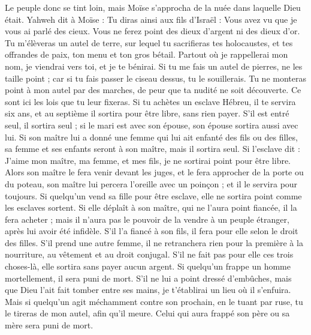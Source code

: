 \begin{multicols}{2}
Le peuple donc se tint loin, mais Moïse s'approcha de la nuée dans laquelle Dieu était.
Yahweh dit à Moïse : Tu diras ainsi aux fils d'Israël : Vous avez vu que je vous ai parlé des cieux.
Vous ne ferez point des dieux d'argent ni des dieux d'or.
Tu m’élèveras un autel de terre, sur lequel tu sacrifieras tes holocaustes, et tes offrandes de paix, ton menu et ton gros bétail. Partout où je rappellerai mon nom, je viendrai vers toi, et je te bénirai.
Si tu me fais un autel de pierres, ne les taille point ; car si tu fais passer le ciseau dessus, tu le souillerais.
Tu ne monteras point à mon autel par des marches, de peur que ta nudité ne soit découverte.
\VerseOne{}Ce sont ici les lois que tu leur fixeras.
Si tu achètes un esclave Hébreu, il te servira six ans, et au septième il sortira pour être libre, sans rien payer.
S'il est entré seul, il sortira seul ; si le mari est avec son épouse, son épouse sortira aussi avec lui.
Si son maître lui a donné une femme qui lui ait enfanté des fils ou des filles, sa femme et ses enfants seront à son maître, mais il sortira seul.
Si l'esclave dit : J'aime mon maître, ma femme, et mes fils, je ne sortirai point pour être libre.
Alors son maître le fera venir devant les juges, et le fera approcher de la porte ou du poteau, son maître lui percera l'oreille avec un poinçon ; et il le servira pour toujours.
Si quelqu'un vend sa fille pour être esclave, elle ne sortira point comme les esclaves sortent.
Si elle déplaît à son maître, qui ne l'aura point fiancée, il la fera acheter ; mais il n'aura pas le pouvoir de la vendre à un peuple étranger, après lui avoir été infidèle.
S'il l'a fiancé à son fils, il fera pour elle selon le droit des filles.
S’il prend une autre femme, il ne retranchera rien pour la première à la nourriture, au vêtement et au droit conjugal.
S'il ne fait pas pour elle ces trois choses-là, elle sortira sans payer aucun argent.
Si quelqu'un frappe un homme mortellement, il sera puni de mort.
S'il ne lui a point dressé d'embûches, mais que Dieu l'ait fait tomber entre ses mains, je t'établirai un lieu où il s'enfuira.
Mais si quelqu'un agit méchamment contre son prochain, en le tuant par ruse, tu le tireras de mon autel, afin qu'il meure.
Celui qui aura frappé son père ou sa mère sera puni de mort.

\end{multicols}
